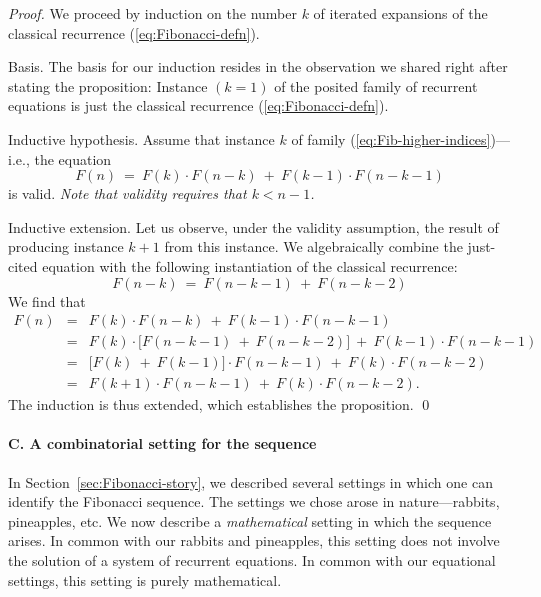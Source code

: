 \begin{proof}
We proceed by induction on the number $k$ of iterated expansions of the classical recurrence (\ref{eq:Fibonacci-defn}).

\medskip

\noindent
{\sf Basis}.
The basis for our induction resides in the observation we shared right after stating the proposition: Instance $(k = 1)$ of the posited family of recurrent equations is just the classical recurrence (\ref{eq:Fibonacci-defn}).

\medskip

\noindent
{\sf Inductive hypothesis}.
Assume that instance $k$ of family (\ref{eq:Fib-higher-indices})---i.e., the equation
\[ F(n) \ = \ F(k) \cdot F(n-k) \ + \ F(k-1) \cdot F(n-k-1) \]
is valid.  {\em Note that validity requires that $k < n-1$.}

\medskip

\noindent
{\sf Inductive extension}.
Let us observe, under the validity assumption, the result of producing instance $k+1$ from this instance.  We algebraically combine the just-cited equation with the following instantiation of the classical recurrence:
\[ F(n-k) \ = \ F(n-k-1) \ + \ F(n-k-2) \]
We find that
\begin{eqnarray*}
F(n) & = & F(k) \cdot F(n-k) \ + \ F(k-1) \cdot F(n-k-1) \\
     & = & F(k) \cdot \big[ F(n-k-1) \ + \ F(n-k-2) \big]  \ +
             \ F(k-1) \cdot F(n-k-1) \\
     & = & \big[ F(k) \ + \ F(k-1) \big] \cdot F(n-k-1) \ + \ F(k)
             \cdot F(n-k-2) \\
     & = & F(k+1) \cdot F(n-k-1) \ + \ F(k) \cdot F(n-k-2).
\end{eqnarray*}
The induction is thus extended, which establishes the proposition.  \qed 
\end{proof}


\paragraph{C. A combinatorial setting for the sequence}

In Section~\ref{sec:Fibonacci-story}, we described several settings in which one can identify the Fibonacci sequence.  The settings we chose arose in nature---rabbits, pineapples, etc.  We now describe a {\em mathematical} setting in which the sequence arises.  In common with our rabbits and pineapples, this setting does not involve the solution of a system of recurrent equations.  In common with our equational settings, this setting is purely mathematical.

